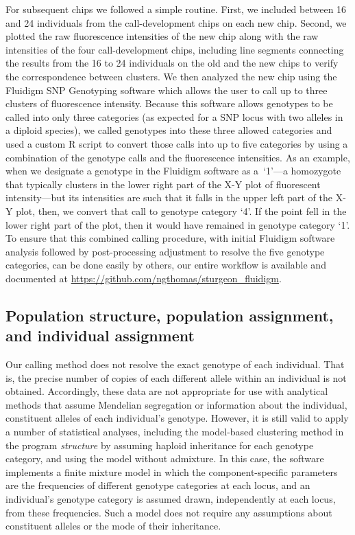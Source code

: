 For subsequent chips we followed a simple routine. First, we included between 16
and 24 individuals from the call-development chips on each new chip. Second, we
plotted the raw fluorescence intensities of the new chip along with the raw
intensities of the four call-development chips, including line segments
connecting the results from the 16 to 24 individuals on the old and the new
chips to verify the correspondence between clusters. 
We then analyzed the new chip using the Fluidigm SNP Genotyping
software which allows the user to call up to three clusters of 
fluorescence intensity. Because
this software allows genotypes to be called into only three categories (as
expected for a SNP locus with two alleles in a diploid species), we called genotypes
into these three allowed categories and used a custom R script \citep{RCore2015} 
to convert those calls into up to five categories by using
a combination of the genotype calls and the fluorescence intensities. As
an example, when we designate a genotype in the Fluidigm software as a~`1'---a homozygote that typically clusters
in the lower right part of the X-Y plot of fluorescent intensity---but its
intensities are such that it falls in the upper left part of the X-Y plot, then,
we convert that call to genotype category `4'. If the point fell in
the lower right part of the plot, then it would have remained in genotype
category `1'.  To ensure that this combined calling procedure, with initial
Fluidigm software analysis followed by post-processing adjustment
to resolve the five genotype categories, can be done easily by others, our 
entire workflow is available and documented at \url{https://github.com/ngthomas/sturgeon_fluidigm}.



\subsection{Population structure,  population assignment, and individual assignment}

Our calling method does not resolve the exact genotype of each individual. That is, the
precise number of copies of each different allele within an individual is not
obtained. Accordingly, these data are not appropriate for use with analytical
methods that assume Mendelian segregation or information about the individual, 
constituent alleles of each
individual's genotype. However, it is still valid to apply 
a number of statistical analyses, including the model-based clustering method
in the program {\em structure} by assuming haploid inheritance for each genotype category,
and using the model without admixture. 
In this case, the software implements a finite mixture model in which 
the component-specific parameters are the frequencies of different genotype categories
at each locus, and an individual's genotype category is assumed drawn, independently 
at each locus, from these frequencies.  
Such a model does not require any assumptions about
constituent alleles or the mode of their inheritance.

